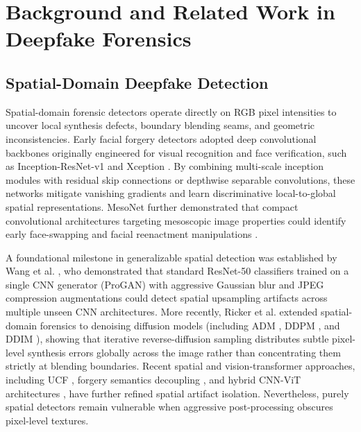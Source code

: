 \documentclass[fleqn,10pt]{wlscirep}
\begin{document}
\section*{Background and Related Work in Deepfake Forensics}
\subsection*{Spatial-Domain Deepfake Detection}
Spatial-domain forensic detectors operate directly on RGB pixel intensities to uncover local synthesis defects, boundary blending seams, and geometric inconsistencies. Early facial forgery detectors adopted deep convolutional backbones originally engineered for visual recognition and face verification, such as Inception-ResNet-v1 \cite{ref14} and Xception \cite{ref28}. By combining multi-scale inception modules with residual skip connections or depthwise separable convolutions, these networks mitigate vanishing gradients and learn discriminative local-to-global spatial representations. MesoNet \cite{ref24} further demonstrated that compact convolutional architectures targeting mesoscopic image properties could identify early face-swapping and facial reenactment manipulations \cite{ref18, ref20}.

A foundational milestone in generalizable spatial detection was established by Wang et al. \cite{ref4}, who demonstrated that standard ResNet-50 classifiers trained on a single CNN generator (ProGAN) with aggressive Gaussian blur and JPEG compression augmentations could detect spatial upsampling artifacts across multiple unseen CNN architectures. More recently, Ricker et al. \cite{ref5} extended spatial-domain forensics to denoising diffusion models (including ADM \cite{ref3}, DDPM \cite{ref1}, and DDIM \cite{ref2}), showing that iterative reverse-diffusion sampling distributes subtle pixel-level synthesis errors globally across the image rather than concentrating them strictly at blending boundaries. Recent spatial and vision-transformer approaches, including UCF \cite{ref31}, forgery semantics decoupling \cite{ref29}, and hybrid CNN-ViT architectures \cite{ref30}, have further refined spatial artifact isolation. Nevertheless, purely spatial detectors remain vulnerable when aggressive post-processing obscures pixel-level textures.
\end{document}
